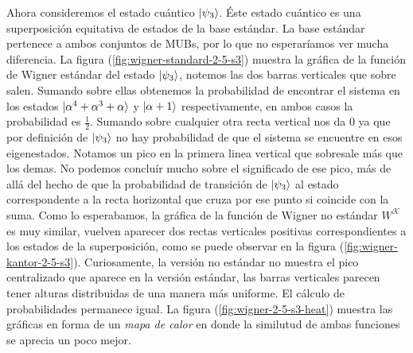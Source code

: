 \documentclass[a4paper,11pt]{report}
\begin{document}
  Ahora consideremos el estado cuántico $\ket{\psi_3}$. Éste
  estado cuántico es una superposición equitativa de estados
  de la base estándar. La base estándar pertenece a ambos
  conjuntos de MUBs, por lo que no esperaríamos ver mucha
  diferencia. La figura (\ref{fig:wigner-standard-2-5-s3})
  muestra la gráfica de la función de Wigner estándar del
  estado $\ket{\psi_3}$, notemos las dos barras verticales
  que sobre salen. Sumando sobre ellas obtenemos la
  probabilidad de encontrar el sistema en los estados
  $\ket{\alpha^{4}+\alpha^3 + \alpha}$ y $\ket{\alpha+1}$
  respectivamente, en ambos casos la probabilidad es
  $\frac{1}{2}$. Sumando sobre cualquier otra recta vertical
  nos da 0 ya que por definición de $\ket{\psi_3}$ no hay
  probabilidad de que el sistema se encuentre en esos
  eigenestados. Notamos un pico en la primera linea vertical
  que sobresale más que los demas. No podemos concluír mucho
  sobre el significado de ese pico, más de allá del hecho de
  que la probabilidad de transición de $\ket{\psi_3}$ al
  estado correspondente a la recta horizontal que cruza por
  ese punto si coincide con la suma. Como lo esperabamos, la
  gráfica de la función de Wigner no estándar $W^{\mathcal
  K}$ es muy similar, vuelven aparecer dos rectas verticales
  positivas correspondientes a los estados de la
  superposición, como se puede observar en la figura
  (\ref{fig:wigner-kantor-2-5-s3}). Curiosamente, la versión
  no estándar no muestra el pico centralizado que aparece en
  la versión estándar, las barras verticales parecen tener
  alturas distribuidas de una manera más uniforme. El
  cálculo de probabilidades permanece igual. La figura
  (\ref{fig:wigner-2-5-s3-heat}) muestra las gráficas en
  forma de un \textit{mapa de calor} en donde la similutud
  de ambas funciones se aprecia un poco mejor.
\end{document}
